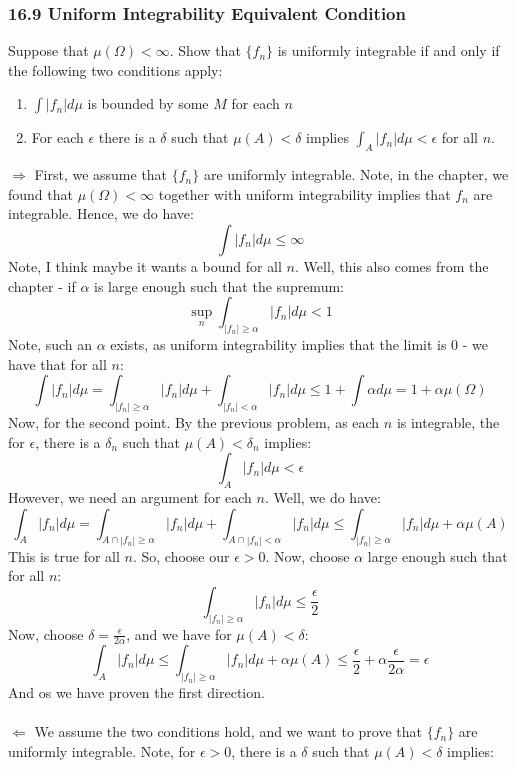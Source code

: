 \documentclass[12pt,a4paper]{article}
\newcommand{\1}[1]{\mathbbm{1}\left\{ #1 \right\}}
\begin{document}
\subsubsection{16.9 Uniform Integrability Equivalent Condition} Suppose that $\mu(\Omega) < \infty$. Show that $\{f_n\}$ is uniformly integrable if and only if the following two conditions apply:
\begin{enumerate}
	\item $\int |f_n| d\mu$ is bounded by some $M$ for each $n$
	\item For each $\epsilon$ there is a $\delta$ such that $\mu(A) < \delta$ implies $\int_A |f_n| d\mu < \epsilon$ for all $n$.
\end{enumerate}
$\Rightarrow$ First, we assume that $\{f_n\}$ are uniformly integrable. Note, in the chapter, we found that $\mu(\Omega) < \infty$ together with uniform integrability implies that $f_n$ are integrable. Hence, we do have:
$$
	\int |f_n| d\mu \leq \infty
$$
Note, I think maybe it wants a bound for all $n$. Well, this also comes from the chapter - if $\alpha$ is large enough such that the supremum:
$$
	\sup_n \int_{|f_n| \geq \alpha} |f_n| d\mu < 1
$$
Note, such an $\alpha$ exists, as uniform integrability implies that the limit is 0 - we have that for all $n$:
$$
	\int |f_n| d\mu =
	\int_{|f_n| \geq \alpha} |f_n| d\mu +
	\int_{|f_n| < \alpha} |f_n| d\mu \leq
	1 + \int \alpha d\mu = 1 + \alpha \mu(\Omega)
$$
Now, for the second point. By the previous problem, as each $n$ is integrable, the for $\epsilon$, there is a $\delta_n$ such that $\mu(A) < \delta_n$ implies:
$$
	\int_A |f_n| d\mu < \epsilon
$$
However, we need an argument for each $n$. Well, we do have:
$$
	\int_A |f_n| d\mu =
	\int_{A \cap |f_n| \geq \alpha} |f_n| d\mu +
	\int_{A \cap |f_n| < \alpha} |f_n| d\mu \leq
	\int_{|f_n| \geq \alpha} |f_n| d\mu + \alpha\mu(A)
$$
This is true for all $n$. So, choose our $\epsilon > 0$. Now, choose $\alpha$ large enough such that for all $n$:
$$
	\int_{|f_n| \geq \alpha} |f_n| d\mu \leq \frac{\epsilon}{2}
$$
Now, choose $\delta = \frac{\epsilon}{2\alpha}$, and we have for $\mu(A) < \delta$:
$$
	\int_A |f_n| d\mu \leq
	\int_{|f_n| \geq \alpha} |f_n| d\mu + \alpha\mu(A) \leq
	\frac{\epsilon}{2} + \alpha \frac{\epsilon}{2\alpha} = \epsilon
$$
And os we have proven the first direction.
\\\\
$\Leftarrow$ We assume the two conditions hold, and we want to prove that $\{f_n\}$ are uniformly integrable. Note, for $\epsilon > 0$, there is a $\delta$ such that $\mu(A) < \delta$ implies:
\end{document}
